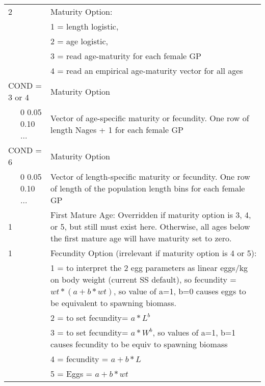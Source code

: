 \begin{center}
\begin{longtable}{p{0.5cm} p{2cm} p{12cm}}
	   2 & & Maturity Option: \\
	     & & 1 = length logistic,\\
	     & & 2 = age logistic,\\
	     & & 3 = read age-maturity for each female GP\\
	     & & 4 = read an empirical age-maturity vector for all ages\\
	   \hline

	   \multicolumn{2}{l}{COND = 3 or 4} & Maturity Option\\
	   & 0 0.05 0.10 ... & Vector of age-specific maturity or fecundity.  One row of length Nages + 1 for each female GP\\
	   \multicolumn{2}{l}{COND = 6} & Maturity Option\\
	   & 0 0.05 0.10 ... & Vector of length-specific maturity or fecundity.  One row of length of the population length bins for each female GP\\
	   \hline

	   
	   1 & & First Mature Age: Overridden if maturity option is 3, 4, or 5, but still must exist here.  Otherwise, all ages below the first mature age will have maturity set to zero.\\
	   \hline	  

	   1 & & Fecundity Option (irrelevant if maturity option is 4 or 5):\\
	     & & 1 = to  interpret the 2 egg parameters as linear eggs/kg on body weight (current SS default),  so fecundity = $wt * (a+b*wt)$, so value of a=1, b=0 causes eggs to be equivalent to spawning biomass.\\
	     & & 2 = to set fecundity= $a*L^ b$\\
	     & & 3 = to set fecundity= $a*W^ b$, so values of a=1, b=1 causes fecundity to be equiv to spawning biomass\\
	     & & 4 = fecundity = $a+b*L$\\
	     & & 5 = Eggs = $a+b*wt$\\
	  \hline


\end{longtable}
\end{center}
